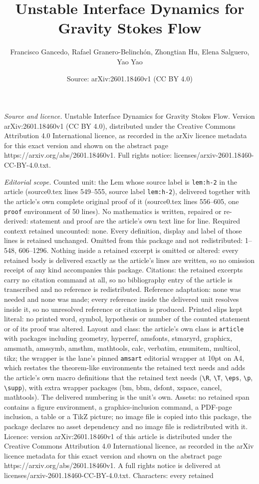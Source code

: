 \documentclass[10pt,a4paper]{amsart}
\title[Unstable Interface Dynamics for Gravity Stokes Flow]{Unstable Interface Dynamics for Gravity Stokes Flow}
\author{Francisco Gancedo, Rafael Granero-Belinch\'on, Zhongtian Hu, Elena Salguero, Yao Yao}
\date{Source: arXiv:2601.18460v1 (CC BY 4.0)}
\begin{document}
\maketitle

\noindent\emph{Source and licence.} Unstable Interface Dynamics for Gravity Stokes Flow. Version arXiv:2601.18460v1 (CC BY 4.0), distributed under the Creative Commons Attribution 4.0 International licence, as recorded in the arXiv licence metadata for this exact version and shown on the abstract page https://arxiv.org/abs/2601.18460v1. Full rights notice: licenses/arxiv-2601.18460-CC-BY-4.0.txt.\par\smallskip

\noindent\textit{Editorial scope.} Counted unit: the Lem whose source label is \texttt{lem:h-2} in the article (source0.tex lines 549--555, source label \texttt{lem:h-2}), delivered together with the article's own complete original proof of it (source0.tex lines 556--605, one \texttt{proof} environment of 50 lines). No mathematics is written, repaired or re-derived: statement and proof are the article's own text line for line. Required context retained uncounted: none. Every definition, display and label of those lines is retained unchanged. Omitted from this package and not redistributed: 1--548, 606--1296. Nothing inside a retained excerpt is omitted or altered: every retained body is delivered exactly as the article's lines are written, so no omission receipt of any kind accompanies this package. Citations: the retained excerpts carry no citation command at all, so no bibliography entry of the article is transcribed and no reference is redistributed. Reference adaptation: none was needed and none was made; every reference inside the delivered unit resolves inside it, so no unresolved reference or citation is produced. Printed slips kept literal: no printed word, symbol, hypothesis or number of the counted statement or of its proof was altered. Layout and class: the article's own class is \texttt{article} with packages including geometry, hyperref, amsfonts, stmaryrd, graphicx, amsmath, amssymb, amsthm, mathtools, calc, verbatim, enumitem, multicol, tikz; the wrapper is the lane's pinned \texttt{amsart} editorial wrapper at 10pt on A4, which restates the theorem-like environments the retained text needs and adds the article's own macro definitions that the retained text needs (\texttt{\textbackslash R}, \texttt{\textbackslash T}, \texttt{\textbackslash eps}, \texttt{\textbackslash p}, \texttt{\textbackslash supp}), with extra wrapper packages (bm, bbm, dsfont, xspace, cancel, mathtools). The delivered numbering is the unit's own. Assets: no retained span contains a figure environment, a graphics-inclusion command, a PDF-page inclusion, a table or a TikZ picture; no image file is copied into this package, the package declares no asset dependency and no image file is redistributed with it. Licence: version arXiv:2601.18460v1 of this article is distributed under the Creative Commons Attribution 4.0 International licence, as recorded in the arXiv licence metadata for this exact version and shown on the abstract page https://arxiv.org/abs/2601.18460v1. A full rights notice is delivered at licenses/arxiv-2601.18460-CC-BY-4.0.txt. Characters: every retained 
\end{document}
